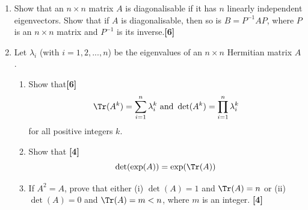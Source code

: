 \documentclass[a4paper]{article}
\begin{document}
\newpage
\begin{qns}\leavevmode
\begin{enumerate}[label=(\roman*)]
\item Show that an $n\times n$ matrix $A$ is diagonalisable if it has $n$ linearly independent eigenvectors. Show that if $A$ is diagonalisable, then so is $B = P^{−1}AP$, where $P$ is an $n\times n$ matrix and $P^{−1}$ is its inverse.\hfill \textbf{[6]}
\item Let $\lambda_i$ (with $i=1,2,...,n$) be the eigenvalues of an $n\times n$ Hermitian matrix $A$.
\begin{enumerate}[label=(\alph*)]
\item Show that\hfill \textbf{[6]}
$$\Tr(A^k)=\sum_{i=1}^n\lambda_i^k\text{ and } \det(A^k)=\prod_{i=1}^n\lambda_i^k$$
for all positive integers $k$.
\item Show that \hfill \textbf{[4]}
$$\det(\exp(A))=\exp(\Tr(A))$$
\item If $A^2=A$, prove that either (i) $\det(A)=1$ and $\Tr(A)=n$ or (ii) $\det(A)=0$ and $\Tr(A)=m<n$, where $m$ is an integer. \hfill \textbf{[4]}
\end{enumerate}
\end{enumerate}
\end{qns}
\end{document}
